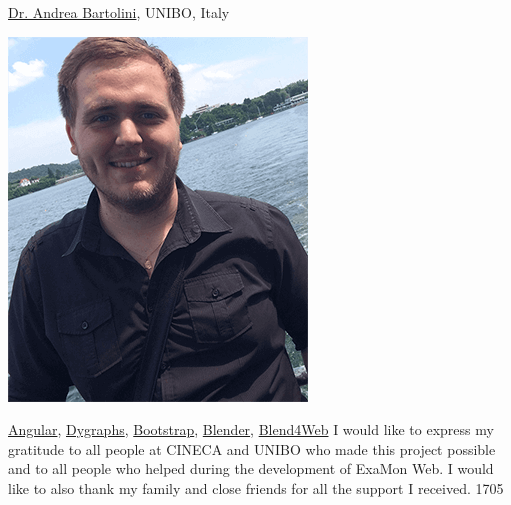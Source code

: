 \documentclass[a4paper, twoside]{article}
\begin{document}
\begin{multicols}{3}
\begin{minipage}[b]{0.7\linewidth}
\begin{flushleft}
    \href{mailto:a.bartolini@unibo.it}{Dr. Andrea Bartolini}, UNIBO, Italy
\end{flushleft}
\end{minipage}\hfill%
\begin{minipage}[b]{0.3\linewidth}
  \includegraphics[width=\linewidth]{profile_photo}\par
  \tiny\theauthor
\end{minipage}%
\vspace{-1.5ex}%
\begin{flushleft}
    \href{https://www.angular.io}{Angular}, 
    \href{http://dygraphs.com}{Dygraphs}, 
    \href{http://getbootstrap.com}{Bootstrap}, 
    \href{https://www.blender.org}{Blender}, 
    \href{https://www.blend4web.com/en/}{Blend4Web}
  I would like to express my gratitude to all people at CINECA and UNIBO who made this project possible and to all people who helped during the development of ExaMon Web. I would like to also thank my family and close friends for all the support I received.
 1705
\end{flushleft}

\end{multicols}
\end{document}
